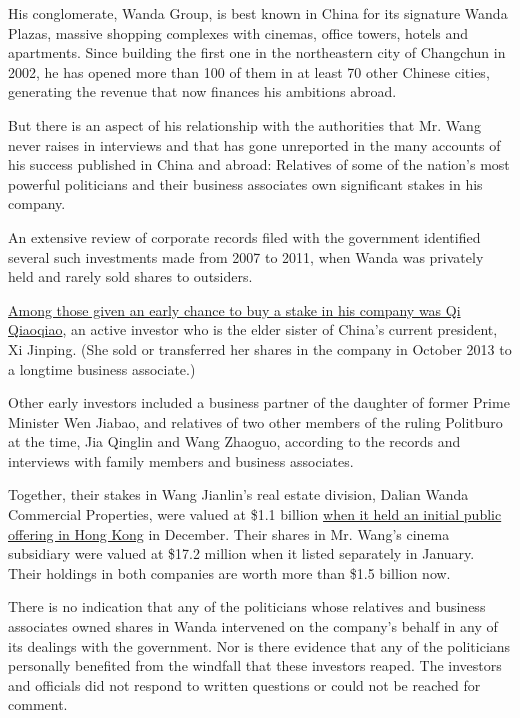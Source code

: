 His conglomerate, Wanda Group, is best known in China for its signature
Wanda Plazas, massive shopping complexes with cinemas, office towers,
hotels and apartments. Since building the first one in the northeastern
city of Changchun in 2002, he has opened more than 100 of them in at
least 70 other Chinese cities, generating the revenue that now finances
his ambitions abroad.

But there is an aspect of his relationship with the authorities that Mr.
Wang never raises in interviews and that has gone unreported in the many
accounts of his success published in China and abroad: Relatives of some
of the nation's most powerful politicians and their business associates
own significant stakes in his company.

An extensive review of corporate records filed with the government
identified several such investments made from 2007 to 2011, when Wanda
was privately held and rarely sold shares to outsiders.

\href{http://www.bloomberg.com/news/articles/2012-06-29/xi-jinping-millionaire-relations-reveal-fortunes-of-elite}{Among
those given an early chance to buy a stake in his company was Qi
Qiaoqiao}, an active investor who is the elder sister of China's current
president, Xi Jinping. (She sold or transferred her shares in the
company in October 2013 to a longtime business associate.)

Other early investors included a business partner of the daughter of
former Prime Minister Wen Jiabao, and relatives of two other members of
the ruling Politburo at the time, Jia Qinglin and Wang Zhaoguo,
according to the records and interviews with family members and business
associates.

Together, their stakes in Wang Jianlin's real estate division, Dalian
Wanda Commercial Properties, were valued at \$1.1 billion
\href{http://dealbook.nytimes3xbfgragh.onion/2014/12/16/dalian-wanda-commercial-a-chinese-developer-raises-3-7-billion-in-i-p-o/}{when
it held an initial public offering in Hong Kong} in December. Their
shares in Mr. Wang's cinema subsidiary were valued at \$17.2 million
when it listed separately in January. Their holdings in both companies
are worth more than \$1.5 billion now.

There is no indication that any of the politicians whose relatives and
business associates owned shares in Wanda intervened on the company's
behalf in any of its dealings with the government. Nor is there evidence
that any of the politicians personally benefited from the windfall that
these investors reaped. The investors and officials did not respond to
written questions or could not be reached for comment.

